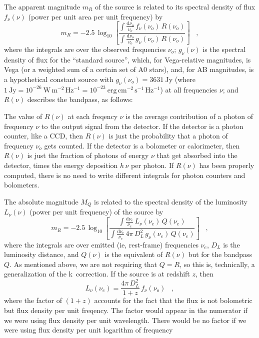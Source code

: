 \documentclass[preprint]{aastex}
\begin{document}
The apparent magnitude $m_R$ of the source is related to its spectral
density of flux $f_{\nu}(\nu)$ (power per unit area per unit frequency) by
\begin{equation}
m_R = -2.5\,\log_{10}\left[
  \frac{\displaystyle
          \int\frac{\mathrm{d}\nu_o}{\nu_o}\,f_{\nu}(\nu_o)\,R(\nu_o)}
       {\displaystyle
          \int\frac{\mathrm{d}\nu_o}{\nu_o}\,g_{\nu}(\nu_o)\,R(\nu_o)}
\right] \;\;\;,
\end{equation}
where the integrals are over the observed frequencies $\nu_o$;
$g_{\nu}(\nu)$ is the spectral density of flux for the ``standard
source'', which, for Vega-relative magnitudes, is Vega (or a weighted
sum of a certain set of A0 stars), and, for AB magnitudes, is a
hypothetical constant source with $g_{\nu}(\nu_o)=3631~\mathrm{Jy}$
(where $1~\mathrm{Jy}= 10^{-26}~\mathrm{W\,m^{-2}\,Hz^{-1}}=
10^{-23}~\mathrm{erg\,cm^{-2}\,s^{-1}\,Hz^{-1}}$) at all frequencies
$\nu$; and $R(\nu)$ describes the bandpass, as follows:

The value of $R(\nu)$ at each freqency $\nu$ is the average
contribution of a photon of frequency $\nu$ to the output signal from
the detector.  If the detector is a photon counter, like a CCD, then
$R(\nu)$ is just the probability that a photon of frequency $\nu_o$
gets counted.  If the detector is a bolometer or calorimeter, then
$R(\nu)$ is just the fraction of photons of energy $\nu$ that get
absorbed into the detector, times the energy deposition $h\,\nu$ per
photon.  If $R(\nu)$ has been properly computed, there is no need to
write different integrals for photon counters and bolometers.

The absolute magnitude $M_Q$ is related to the spectral density of the
luminosity $L_{\nu}(\nu)$ (power per unit frequency) of the source by
\begin{equation}
m_R = -2.5\,\log_{10}\left[
  \frac{\displaystyle
          \int\frac{\mathrm{d}\nu_e}{\nu_e}\,L_{\nu}(\nu_e)\,
          Q(\nu_e)}
       {\displaystyle
          \int\frac{\mathrm{d}\nu_e}{\nu_e}\,4\pi\,D_L^2\,g_{\nu}(\nu_e)\,
          Q(\nu_e)}
\right] \;\;\;,
\end{equation}
where the integrals are over emitted (ie, rest-frame) frequencies
$\nu_e$, $D_L$ is the luminosity distance, and $Q(\nu)$ is the
equivalent of $R(\nu)$ but for the bandpass $Q$.  As mentioned above,
we are not requiring that $Q=R$, so this is, technically, a
generalization of the k~correction.  If the source is at redshift $z$,
then
\begin{equation}
L_{\nu}(\nu_e) = \frac{4\pi\,D_L^2}{1+z}\,f_{\nu}(\nu_o) \;\;\;,
\end{equation}
where the factor of $(1+z)$ accounts for the fact that the flux is not
bolometric but flux density per unit freqency.  The factor would
appear in the numerator if we were using flux density per unit
wavelength.  There would be no factor if we were using flux density
per unit logarithm of frequency
\end{document}
